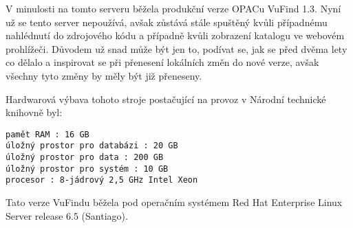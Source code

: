 \label{sec:vufind1}
V minulosti na tomto serveru běžela produkční verze OPACu VuFind 1.3. Nyní už se tento server nepoužívá, avšak zůstává stále spuštěný kvůli případnému nahlédnutí do zdrojového kódu a případně kvůli zobrazení katalogu ve webovém prohlížeči. Důvodem už snad může být jen to, podívat se, jak se před dvěma lety co dělalo a inspirovat se při přenesení lokálních změn do nové verze, avšak všechny tyto změny by měly být již přeneseny.

Hardwarová výbava tohoto stroje postačující na provoz v Národní technické knihovně byl:
\begin{verbatim}
pamět RAM : 16 GB
úložný prostor pro databázi : 20 GB
úložný prostor pro data : 200 GB
úložný prostor pro systém : 10 GB
procesor : 8-jádrový 2,5 GHz Intel Xeon
\end{verbatim}

Tato verze VuFindu běžela pod operačním systémem Red Hat Enterprise Linux Server release 6.5 (Santiago).




